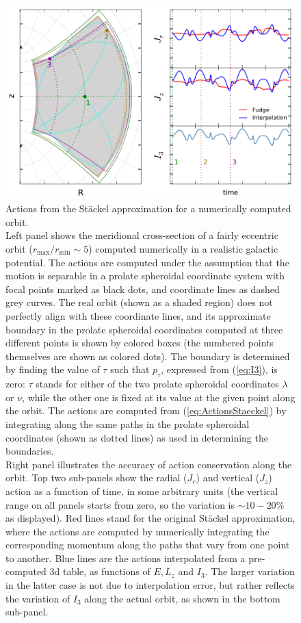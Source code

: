 \documentclass[12pt]{article}
\begin{document}
\begin{figure}
\includegraphics[width=16cm]{StaeckelOrbit.pdf}
\caption{Actions from the St\"ackel approximation for a numerically computed orbit. \protect\\
Left panel shows the meridional cross-section of a fairly eccentric orbit ($r_\mathrm{max}/r_\mathrm{min} \sim 5$) computed numerically in a realistic galactic potential.
The actions are computed under the assumption that the motion is separable in a prolate spheroidal coordinate system with focal points marked as black dots, and coordinate lines as dashed grey curves. The real orbit (shown as a shaded region) does not perfectly align with these coordinate lines, and its approximate boundary in the prolate spheroidal coordinates computed at three different points is shown by colored boxes (the numbered points themselves are shown as colored dots). The boundary is determined by finding the value of $\tau$ such that $p_\tau$, expressed from (\ref{eq:I3}), is zero: $\tau$ stands for either of the two prolate spheroidal coordinates $\lambda$ or $\nu$, while the other one is fixed at its value at the given point along the orbit. The actions are computed from (\ref{eq:ActionsStaeckel}) by integrating along the same paths in the prolate spheroidal coordinates (shown as dotted lines) as used in determining the boundaries. \protect\\
Right panel illustrates the accuracy of action conservation along the orbit. Top two sub-panels show the radial ($J_r$) and vertical ($J_z$) action as a function of time, in some arbitrary units (the vertical range on all panels starts from zero, so the variation is $\sim 10-20\%$ as displayed). Red lines stand for the original St\"ackel approximation, where the actions are computed by numerically integrating the corresponding momentum along the paths that vary from one point to another. Blue lines are the actions interpolated from a pre-computed 3d table, as functions of $E, L_z$ and $I_3$. The larger variation in the latter case is not due to interpolation error, but rather reflects the variation of $I_3$ along the actual orbit, as shown in the bottom sub-panel. 
}  \label{fig:StaeckelOrbit}
\end{figure}
\end{document}
